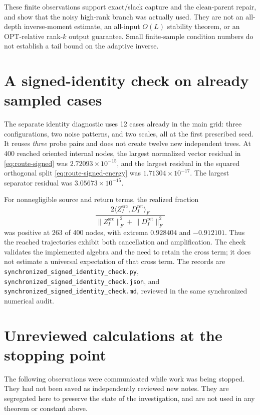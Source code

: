 \documentclass[11pt,oneside,openany,a4paper]{report}
\numberwithin{equation}{chapter}
\theoremstyle{definition}
\theoremstyle{remark}
\newcommand{\sourcefile}[1]{{\small\nolinkurl{#1}}}
\begin{document}
These finite observations support exact/slack capture and the
clean-parent repair, and show that the noisy high-rank branch was
actually used.  They are not an all-depth inverse-moment estimate, an
all-input $O(L)$ stability theorem, or an OPT-relative rank-$k$ output
guarantee.  Small finite-sample condition numbers do not establish a
tail bound on the adaptive inverse.

\section{A signed-identity check on already sampled cases}

The separate identity diagnostic uses 12 cases already in the main
grid: three configurations, two noise patterns, and two scales, all
at the first prescribed seed.  It reuses \emph{three} probe pairs and
does not create twelve new independent trees.  At 400 reached oriented
internal nodes, the largest normalized vector residual in
\eqref{eq:route-signed} was $2.72093\times10^{-15}$, and the largest
residual in the squared orthogonal split
\eqref{eq:route-signed-energy} was $1.71304\times10^{-17}$.
The largest separator residual was $3.05673\times10^{-15}$.

For nonnegligible source and return terms, the realized fraction
\[
 \frac{2\langle Z_I^{\mathrm{src}},D_I^{\mathrm{ret}}\rangle_F}
 {\lVert Z_I^{\mathrm{src}}\rVert_F^2+
  \lVert D_I^{\mathrm{ret}}\rVert_F^2}
\]
was positive at 263 of 400 nodes, with extrema $0.928404$ and
$-0.912101$.  Thus the reached trajectories exhibit both cancellation
and amplification.  The check validates the implemented algebra and
the need to retain the cross term; it does not estimate a universal
expectation of that cross term.  The records are
\sourcefile{synchronized_signed_identity_check.py},
\sourcefile{synchronized_signed_identity_check.json}, and
\sourcefile{synchronized_signed_identity_check.md}, reviewed in the
same synchronized numerical audit.

\section{Unreviewed calculations at the stopping point}
\label{sec:route-unreviewed}

The following observations were communicated while work was being
stopped.  They had not been saved as independently reviewed new notes.
They are segregated here to preserve the state of the investigation,
and are not used in any theorem or constant above.
\end{document}
